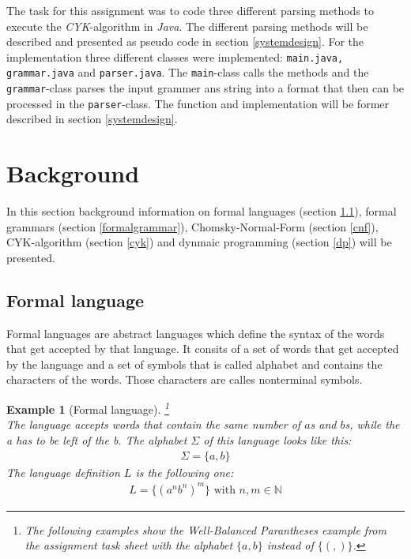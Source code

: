 \documentclass[a4paper, 11pt]{article}
\newtheorem*{example*}{Example}
\begin{document}
The task for this assignment was to code three different parsing methods to execute the \textit{CYK}-algorithm in \textit{Java}. The different parsing methods will be described and presented as pseudo code in section \ref{systemdesign}.
For the implementation three different classes were implemented: \texttt{main.java, grammar.java} and \texttt{parser.java}. The \texttt{main}-class calls the methods and the \texttt{grammar}-class parses the input grammer ans string into a format that then can be processed in the \texttt{parser}-class.
The function and implementation will be former described in section \ref{systemdesign}.




\pagebreak














\section{Background}

In this section background information on formal languages (section \ref{formallanguage}), formal grammars (section \ref{formalgrammar}), Chomsky-Normal-Form (section \ref{cnf}), CYK-algorithm (section \ref{cyk}) and dynmaic programming (section \ref{dp}) will be presented. 


\subsection{Formal language}
\label{formallanguage}
Formal languages are abstract languages which define the syntax of the words that get accepted by that language. It consits of a set of words that get accepted by the language and a set of symbols that is called alphabet and contains the characters of the words. Those characters are calles nonterminal symbols. \cite{cnf, language}

\begin{example*}[Formal language]
\footnote{The following examples show the \textit{Well-Balanced Parantheses} example from the assignment task sheet with the alphabet $\{a, b\}$ instead of $\{(, )\}$. }
\\
The language accepts words that contain the same number of $a$s and $b$s, while the a has to be left of the b. 
The alphabet $\Sigma$ of this language looks like this:
\begin{align*}
\Sigma = \{ a, b\}
\end{align*}
The language definition $L$ is the following one:
\begin{align*}
L = \{ (a^{n}b^{n})^m \} \text{ with } n, m \in \mathbb{N}
\end{align*}

\end{example*}
\end{document}
